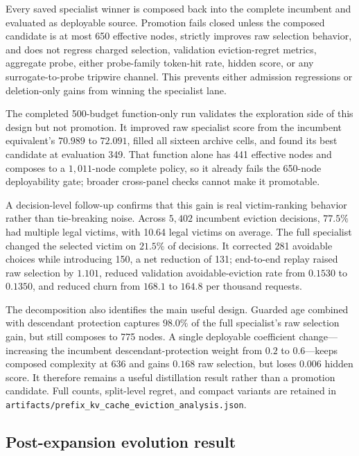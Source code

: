 \documentclass[11pt]{article}
\newcommand{\filepath}[1]{\nolinkurl{#1}}
\begin{document}
Every saved specialist winner is composed back into the complete incumbent and
evaluated as deployable source.  Promotion fails closed unless the composed candidate
is at most 650 effective nodes, strictly improves raw selection behavior, and does not
regress charged selection, validation eviction-regret metrics, aggregate probe, either
probe-family token-hit rate, hidden score, or any surrogate-to-probe tripwire channel.
This prevents either admission regressions or deletion-only gains from winning the
specialist lane.

The completed 500-budget function-only run validates the exploration side of this
design but not promotion.  It improved raw specialist score from the incumbent
equivalent's \(70.989\) to \(72.091\), filled all sixteen archive cells, and found its
best candidate at evaluation 349.  That function alone has 441 effective nodes and
composes to a \(1{,}011\)-node complete policy, so it already fails the 650-node
deployability gate; broader cross-panel checks cannot make it promotable.

A decision-level follow-up confirms that this gain is real victim-ranking behavior
rather than tie-breaking noise.  Across \(5{,}402\) incumbent eviction decisions,
\(77.5\%\) had multiple legal victims, with 10.64 legal victims on average.  The full
specialist changed the selected victim on \(21.5\%\) of decisions.  It corrected 281
avoidable choices while introducing 150, a net reduction of 131; end-to-end replay
raised raw selection by \(1.101\), reduced validation avoidable-eviction rate from
\(0.1530\) to \(0.1350\), and reduced churn from \(168.1\) to \(164.8\) per thousand
requests.

The decomposition also identifies the main useful design.  Guarded age combined with
descendant protection captures \(98.0\%\) of the full specialist's raw selection gain,
but still composes to 775 nodes.  A single deployable coefficient change---increasing
the incumbent descendant-protection weight from \(0.2\) to \(0.6\)---keeps composed
complexity at 636 and gains \(0.168\) raw selection, but loses \(0.006\) hidden score.
It therefore remains a useful distillation result rather than a promotion candidate.
Full counts, split-level regret, and compact variants are retained in
\filepath{artifacts/prefix_kv_cache_eviction_analysis.json}.

\subsection{Post-expansion evolution result}
\label{sec:post-expansion}
\end{document}
